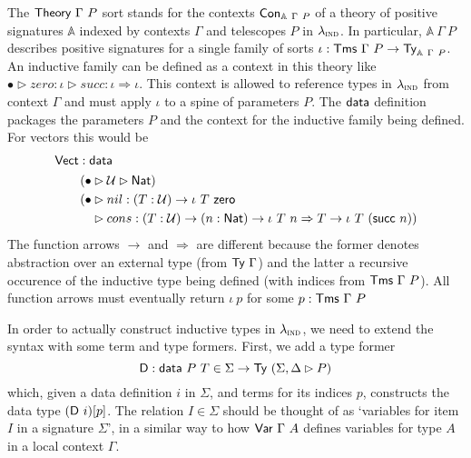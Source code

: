 The $\textsf{Theory}\ \Gamma\ P$ sort stands for the contexts $\textsf{Con}_{\mathbb{A}\ \Gamma\
		P}$ of a theory of positive signatures \cite{Kovacs2023-gq} $\mathbb{A}$ indexed
by contexts $\Gamma$ and telescopes $P$ in $\lambda_{\textsc{ind}}$. In particular,
$\mathbb{A}\ \Gamma\ P$ describes positive signatures for a single family of
sorts $\iota : \Tms\ \Gamma\ P \to \Ty_{\mathbb{A}\ \Gamma\ P}$. An inductive
family can be defined as a context in this theory like $\bullet \rhd zero :
	\iota \rhd succ:\iota \Rightarrow \iota$. This context is allowed to reference
types in $\lambda_{\textsc{ind}}$ from context $\Gamma$ and must apply $\iota$ to a spine of
parameters $P$. The $\textsf{data}$ definition packages the parameters $P$ and the
context for the inductive family being defined. For vectors this would be
\begin{align*}
	 & \mta{Vect} : \mta{data}                                                                                                        \\
	 & \quad\begin{aligned}
		        \quad (\bullet & \rhd\univ \rhd \mta{Nat})\                                                                               \\
		        \quad (\bullet & \rhd nil : (T : \univ) \to \iota\ T\ \mta{zero}                                                          \\
		        \quad          & \rhd cons : (T : \univ) \to (n : \mta{Nat}) \to \iota\ T\ n \Rightarrow T \to \iota\ T\ (\mta{succ}\ n))
	        \end{aligned}
\end{align*}
The function arrows $\to$ and $\Rightarrow$ are different because the former
denotes abstraction over an external type (from $\textsf{Ty}\ \Gamma$) and the latter a
recursive occurence of the inductive type being defined (with indices from
$\textsf{Tms}\ \Gamma\ P$). All function arrows must eventually return $\iota\ p$ for
some $p : \textsf{Tms}\ \Gamma\ P$

In order to actually construct inductive types in $\lambda_{\textsc{ind}}$, we need to
extend the syntax with some term and type formers. First, we add a type former
\[
	\mta{D} : \mta{data}\ P\ T \in \Sigma \to \Ty\ (\Sigma, \Delta \rhd P)
\]
which, given a data definition $i$ in $\Sigma$, and terms for its
indices $p$, constructs the data type $(\mta{D}\ i)[p]$. The relation $I \in
	\Sigma$ should be thought of as `variables for item $I$ in a signature
$\Sigma$', in a similar way to how $\mta{Var}\ \Gamma\ A$ defines variables for
type $A$ in a local context $\Gamma$.

